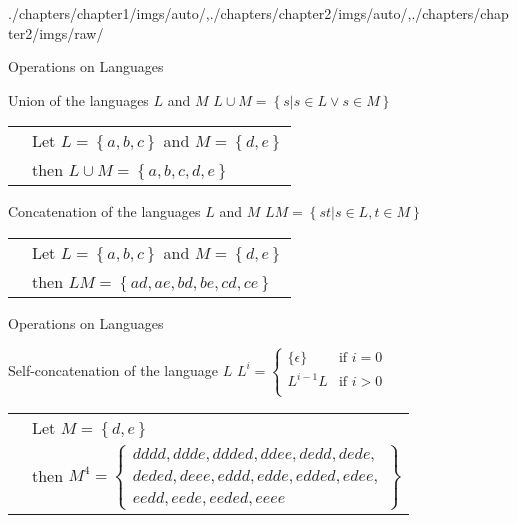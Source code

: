 \begin{graphicspathcontext}{{./chapters/chapter1/imgs/auto/},{./chapters/chapter2/imgs/auto/},{./chapters/chapter2/imgs/raw/}}
\begin{bibunit}[apalike]
\begin{frame}{Operations on Languages}
	\vspace{1cm}
	\begin{block}{Union of the languages $L$ and $M$}
		$L \cup M = \left\{s | s\in L \vee s \in M\right\}$
		\begin{tabularx}{\linewidth}{@{}lX@{}}
		\insertexamplelabel & Let $L = \left\{ a, b ,c \right\}$ and $M = \left\{ d, e \right\}$ \\
		& then $L \cup M = \left\{ a, b, c, d, e \right\}$
		\end{tabularx}
	\end{block}
	\vspace{.5cm}
	\begin{block}{Concatenation of the languages $L$ and $M$}
		$LM = \left\{st | s\in L, t \in M\right\}$
		\begin{tabularx}{\linewidth}{@{}lX@{}}
		\insertexamplelabel & Let $L = \left\{ a, b ,c \right\}$ and $M = \left\{ d, e \right\}$ \\
		& then $LM = \left\{ ad, ae, bd, be, cd, ce \right\}$
		\end{tabularx}
	\end{block}
\end{frame}

\begin{frame}{Operations on Languages \insertcontinuationtext}
	\begin{block}{Self-concatenation of the language $L$}
		$L^i = \begin{cases}
			\{\epsilon\} & \text{if }i=0 \\
			L^{i-1}L & \text{if }i>0 \\
			\end{cases}$
		\begin{tabularx}{\linewidth}{@{}lX@{}}
		\insertexamplelabel & Let $M = \left\{ d, e \right\}$ \\
		& then $M^4 = \left\{ \begin{array}{l}
			\scriptstyle dddd, ddde, ddded, ddee, dedd, dede, \\
			\scriptstyle deded, deee, eddd, edde, edded, edee, \\
			\scriptstyle eedd, eede, eeded, eeee \end{array} \right\}$
		\end{tabularx}
	\end{block}
\end{frame}


\end{bibunit}
\end{graphicspathcontext}
